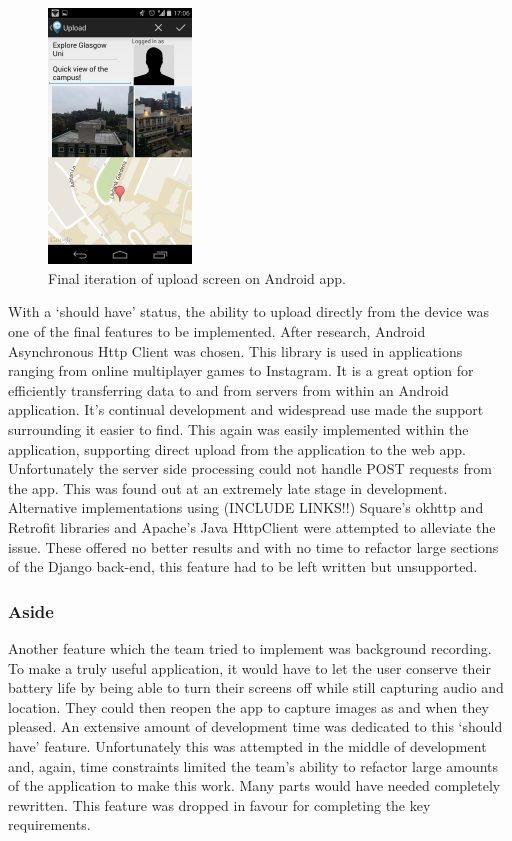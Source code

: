 \documentclass{l3proj}
\begin{document}
\begin{figure}[ht!]
\centering
\includegraphics[width=0.34\textwidth]{images/final-upload-screen.png}
\caption{Final iteration of upload screen on Android app.}
\end{figure}

With a ‘should have’ status, the ability to upload directly from the device was one of the final features to be implemented. After research, Android Asynchronous Http Client was chosen. This library is used in applications ranging from online multiplayer games to Instagram. It is a great option for efficiently transferring data to and from servers from within an Android application. It's continual development and widespread use made the support surrounding it easier to find. This again was easily implemented within the application, supporting direct upload from the application to the web app. Unfortunately the server side processing could not handle POST requests from the app. This was found out at an extremely late stage in development. Alternative implementations using (INCLUDE LINKS!!) Square's okhttp and Retrofit libraries and Apache’s Java HttpClient were attempted to alleviate the issue. These offered no better results and with no time to refactor large sections of the Django back-end, this feature had to be left written but unsupported.

\subsubsection{Aside}
Another feature which the team tried to implement was background recording. To make a truly useful application, it would have to let the user conserve their battery life by being able to turn their screens off while still capturing audio and location. They could then reopen the app to capture images as and when they pleased. An extensive amount of development time was dedicated to this ‘should have’ feature. Unfortunately this was attempted in the middle of development and, again, time constraints limited the team's ability to refactor large amounts of the application to make this work. Many parts would have needed completely rewritten. This feature was dropped in favour for completing the key requirements.
\end{document}
